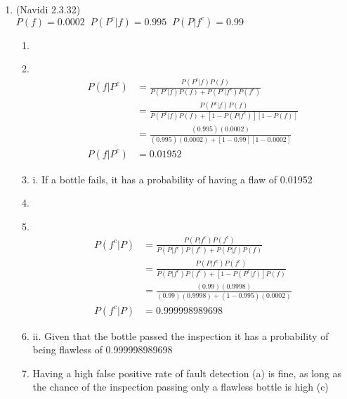\documentclass[11pt]{article}
\newcommand\Item[1][]{%
  \ifx\relax#1\relax  \item \else \item[#1] \fi
  \abovedisplayskip=0pt\abovedisplayshortskip=0pt~\vspace*{-\baselineskip}}
\begin{document}
\begin{enumerate}
        \newpage
        \item (Navidi 2.3.32) \\ %
        $P(f) = 0.0002 \;\; P(P^{c}|f) = 0.995 \;\; P(P|f^{c}) = 0.99$
        \begin{enumerate}
                \Item %
                \begin{align*}
                P(f|P^{c}) &= \frac{P(P^{c}|f)P(f)}{P(P^{c}|f)P(f) + P(P^{c}|f^{c})P(f^{c})} \\
                           &= \frac{P(P^{c}|f)P(f)}{P(P^{c}|f)P(f) + [1-P(P|f^{c})][1-P(f)]} \\
                           &= \frac{(0.995)(0.0002)}{(0.995)(0.0002) + [1-0.99][1-0.0002]} \\
                P(f|P^{c}) &= 0.01952
                \end{align*}
                \item %
                i. If a bottle fails, it has a probability of having a flaw of 0.01952
                \Item %
                \begin{align*}
                P(f^{c}|P) &= \frac{P(P|f^{c})P(f^{c})}{P(P|f^{c})P(f^{c}) + P(P|f)P(f)} \\
                           &= \frac{P(P|f^{c})P(f^{c})}{P(P|f^{c})P(f^{c}) + [1-P(P^{c}|f)]P(f)} \\
                           &= \frac{(0.99)(0.9998)}{(0.99)(0.9998) + (1-0.995)(0.0002)} \\
                P(f^{c}|P) &= 0.999998989698
                \end{align*}
                \item %
                ii. Given that the bottle passed the inspection it has a probability of being flawless of 0.999998989698
                \item %
                Having a high false positive rate of fault detection (a) is fine, as long as the chance of the inspection passing only a flawless bottle is high (c)    
        \end{enumerate}
        

\end{enumerate}
\end{document}
